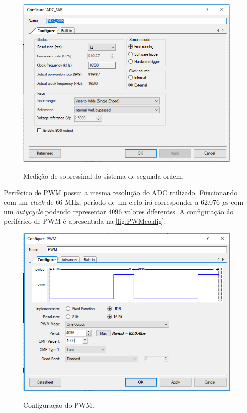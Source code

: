 \documentclass[
	article,			%
	11pt,				%
	oneside,			%
	a4paper,			%
	english,			%
	brazil,				%
	sumario=tradicional
	]{abntex2}
\begin{document}
\begin{figure}[htb!]
	\centering
	\caption{Medição do sobressinal do sistema de segunda ordem.}
	\includegraphics[scale=0.9]{./img/ADCconfig.PNG}
	\label{fig:ADCconfig}
\end{figure}

\pagebreak

Periférico de PWM possui a mesma resolução do ADC utilizado.
Funcionando com um \textit{clock} de 66 MHz, período de um ciclo irá corresponder a 62.076 $\mu$s com um \textit{dutycycle} podendo representar 4096 valores diferentes.
A configuração do periférico de PWM é apresentada na \autoref{fig:PWMconfig}.

\begin{figure}[htb!]
	\centering
	\caption{Configuração do PWM.}
	\includegraphics[scale=0.90]{./img/PWMconfig.PNG}
	\label{fig:PWMconfig}
\end{figure}
\end{document}
